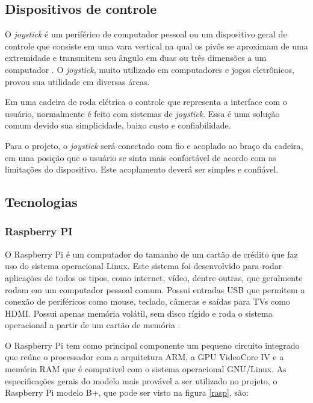 \subsection{Dispositivos de controle}

O \textit{joystick} é um periférico de computador pessoal ou um dispositivo geral de controle que consiste em uma vara vertical na qual os pivôs se aproximam de uma extremidade e transmitem seu ângulo em duas ou três dimensões a um computador \cite{livro_creating_games}. O \textit{joystick}, muito utilizado em computadores e jogos eletrônicos, provou sua utilidade em diversas áreas.

Em uma cadeira de roda elétrica o controle que representa a interface com o usuário, normalmente é feito com sistemas de \textit{joystick}. Essa é uma solução comum devido sua simplicidade, baixo custo e confiabilidade.

Para o projeto, o \textit{joystick} será conectado com fio e acoplado ao braço da cadeira, em uma posição que o usuário se sinta mais confortável de acordo com as limitações do dispositivo. Este acoplamento deverá ser simples e confiável.

\subsection{Tecnologias}
\label{subsec:tecnologias}
\subsubsection{Raspberry PI}

O Raspberry Pi é um computador do tamanho de um cartão de crédito que faz uso do sistema operacional Linux. Este sistema foi desenvolvido para rodar aplicações de todos os tipos, como internet, vídeo, dentre outras, que geralmente rodam em um computador pessoal comum. Possui entradas USB que permitem a conexão de periféricos como mouse, teclado, câmeras e saídas para TVs como HDMI. Possui apenas memória volátil, sem disco rígido e roda o sistema operacional a partir de um cartão de memória \cite{rasp_foundation}.

O Raspberry Pi tem como principal componente um pequeno circuito integrado que reúne o processador com a arquitetura ARM, a GPU VideoCore IV e a memória RAM que é compativel com o sistema operacional GNU/Linux. As especificações gerais do modelo mais provável a ser utilizado no projeto, o Raspberry Pi modelo B+, que pode ser visto na figura \ref{rasp}, são:

